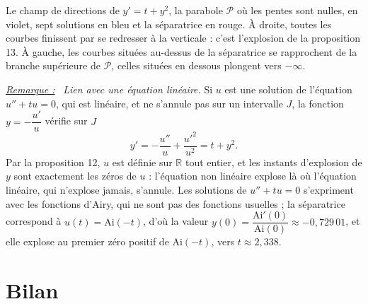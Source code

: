 \documentclass[a4paper,twoside]{report}
\newenvironment{remarque}%
 {\par\needspace{6\baselineskip}\vspace{1mm}\begin{list}{}{\leftmargin=1cm \rightmargin=0.5cm}\item[]%
  \textit{\underline{Remarque :}}~}%
 {\end{list}\vspace{1mm}}
\newcommand{\R}{\mathbb{R}}
\begin{document}
\begin{minipage}{\linewidth}
\begin{center}
\end{center}

\noindent Le champ de directions de $y' = t + y^{2}$, la parabole $\mathcal{P}$ où les pentes sont nulles, en violet, sept solutions en bleu et la séparatrice en rouge. À droite, toutes les courbes finissent par se redresser à la verticale : c'est l'explosion de la proposition 13. À gauche, les courbes situées au-dessus de la séparatrice se rapprochent de la branche supérieure de $\mathcal{P}$, celles situées en dessous plongent vers $-\infty$.
\end{minipage}

\begin{remarque}
\emph{Lien avec une équation linéaire.} Si $u$ est une solution de l'équation $u'' + tu = 0$, qui est linéaire, et ne s'annule pas sur un intervalle $J$, la fonction $y = -\dfrac{u'}{u}$ vérifie sur $J$
\[ y' = -\frac{u''}{u} + \frac{u'^{2}}{u^{2}} = t + y^{2}. \]
Par la proposition 12, $u$ est définie sur $\R$ tout entier, et les instants d'explosion de $y$ sont exactement les zéros de $u$ : l'équation non linéaire explose là où l'équation linéaire, qui n'explose jamais, s'annule. Les solutions de $u'' + tu = 0$ s'expriment avec les fonctions d'Airy, qui ne sont pas des fonctions usuelles ; la séparatrice correspond à $u(t) = \mathrm{Ai}(-t)$, d'où la valeur $y(0) = \dfrac{\mathrm{Ai}'(0)}{\mathrm{Ai}(0)} \approx -0{,}729\,01$, et elle explose au premier zéro positif de $\mathrm{Ai}(-t)$, vers $t \approx 2{,}338$.
\end{remarque}

\section{Bilan}
\end{document}
